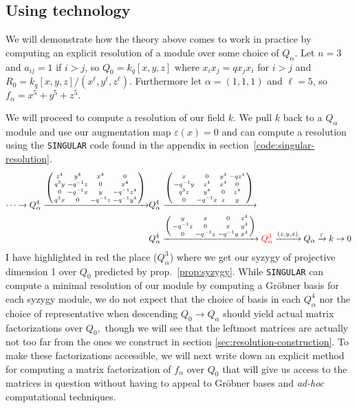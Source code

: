 \documentclass [11pt, proquest] {uwthesis}[2020/02/24]
\begin{document}
\subsection{Using technology}
    We will demonstrate how the theory above comes to work in practice by computing an explicit resolution of a module over some choice of $Q_\alpha$.
    Let $n=3$ and $a_{ij}=1$ if $i>j$, so $Q_0=k_q[x,y,z]$ where $x_ix_j=qx_jx_i$ for $i>j$ and $R_0=k_q[x,y,z]/(x^\ell ,y^\ell ,z^\ell ).$ Furthermore let $\alpha=(1,1,1)$ and $\ell=5$, so $f_\alpha=x^5+y^5+z^5.$ 
    
    We will proceed to compute a resolution of our field $k.$ We pull $k$ back to a $Q_\alpha$ module and use our augmentation map $\varepsilon(x)=0$ and can compute a resolution using the \texttt{SINGULAR} \cite{singular} code found in the appendix in section~\ref{code:singular-resolution}.
    \begin{align*}
        \cdots\to Q^4_\alpha\xrightarrow{\left(
        \begin{smallmatrix}
            z^4& y^4 & x^4 & 0\\
            q^3y & -q^{-1}z & 0 & x^4\\ 
            0 & -q^{-1}x & y & -q^{-1}z^4\\ 
            q^3x & 0 & -q^{-1}z & -q^{-1}y^4\end{smallmatrix}
        \right)} &Q^4_\alpha\xrightarrow{\left(
        \begin{smallmatrix}
            x& 0 & y^4 & -qz^4\\
            -q^{-1}y & z^4 & x^4 & 0\\ 
            q^3z & y^4 & 0 & z^4\\ 
            0 & -q^{-1}x & z & y\end{smallmatrix}
        \right)}\\&{Q_\alpha^4}\xrightarrow{\left(
        \begin{smallmatrix}
            y & x & 0 & z^4\\
            -q^{-1}z & 0 & x & y^4\\ 
            0 & -q^{-1}z & -q^{-1}y & x^4
        \end{smallmatrix}\right)}
        {\color{red}Q_\alpha^3}\xrightarrow{(z,y,x)}Q_\alpha\xrightarrow{\varepsilon} k \to 0
    \end{align*}
    I have highlighted in red the place ($Q_\alpha^3$) where we get our syzygy of projective dimension 1 over $Q_0$ predicted by prop.~\ref{prop:syzygy}. While \texttt{SINGULAR} can compute a minimal resolution of our module by computing a Gr\"obner basis for each syzygy module, we do not expect that the choice of basis in each $Q_\alpha^4$ nor the choice of representative when descending $Q_0\to Q_\alpha$ should yield actual matrix factorizations over $Q_0,$ though we will see that the leftmost matrices are actually not too far from the ones we construct in section \ref{sec:resolution-construction}. To make these factorizations accessible, we will next write down an explicit method for computing a matrix factorization of $f_\alpha$ over $Q_0$ that will give us access to the matrices in question without having to appeal to Gr\"obner bases and \textit{ad-hoc} computational techniques.
\end{document}
